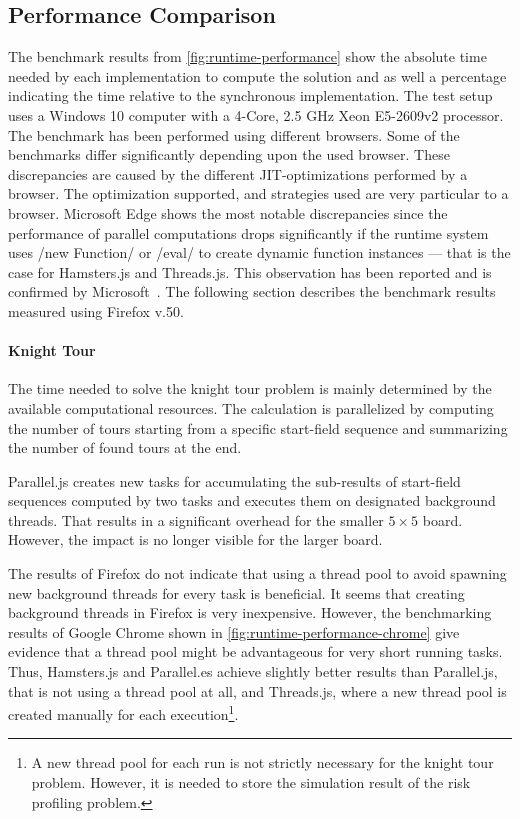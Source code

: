 \subsection{Performance Comparison}
The benchmark results from \cref{fig:runtime-performance} show the absolute time needed by each implementation to compute the solution and as well a percentage indicating the time relative to the synchronous implementation. The test setup uses a Windows 10 computer with a 4-Core, 2.5 GHz Xeon E5-2609v2 processor. The benchmark has been performed using different browsers. Some of the benchmarks differ significantly depending upon the used browser. These discrepancies are caused by the different JIT-optimizations performed by a browser. The optimization supported, and strategies used are very particular to a browser. Microsoft Edge shows the most notable discrepancies since the performance of parallel computations drops significantly if the runtime system uses \javascriptinline/new Function/ or \javascriptinline/eval/ to create dynamic function instances --- that is the case for Hamsters.js and Threads.js. This observation has been reported and is confirmed by Microsoft~\cite{newFunctionWebWorkerEdge}. The following section describes the benchmark results measured using Firefox v.50. 

\begin{figure*}
		
	\caption{Runtime Performance of Parallelization Problems Relative to Synchronous Execution}
	\label{fig:runtime-performance}
\end{figure*}


\paragraph{Knight Tour} The time needed to solve the knight tour problem is mainly determined by the available computational resources. The calculation is parallelized by computing the number of tours starting from a specific start-field sequence and summarizing the  number of found tours at the end. 

Parallel.js creates new tasks for accumulating the sub-results of start-field sequences computed by two tasks and executes them on designated background threads. That results in a significant overhead for the smaller $5\times5$ board. However, the impact is no longer visible for the larger board.

The results of Firefox do not indicate that using a thread pool to avoid spawning new background threads for every task is beneficial. It seems that creating background threads in Firefox is very inexpensive. However, the benchmarking results of Google Chrome shown in \cref{fig:runtime-performance-chrome} give evidence that a thread pool might be advantageous for very short running tasks. Thus, Hamsters.js and Parallel.es achieve slightly better results than Parallel.js, that is not using a thread pool at all, and Threads.js, where a new thread pool is created manually for each execution\footnote{A new thread pool for each run is not strictly necessary for the knight tour problem. However, it is needed to store the simulation result of the risk profiling problem.}. 

